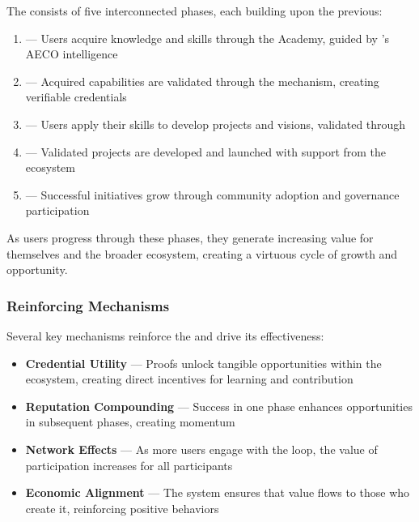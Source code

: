 The  consists of five interconnected phases, each building upon the previous:

\begin{enumerate}
    \item {} — Users acquire knowledge and skills through the Academy, guided by 's AECO intelligence
    
    \item {} — Acquired capabilities are validated through the  mechanism, creating verifiable credentials
    
    \item {} — Users apply their skills to develop projects and visions, validated through 
    
    \item {} — Validated projects are developed and launched with support from the ecosystem
    
    \item {} — Successful initiatives grow through community adoption and governance participation
\end{enumerate}

As users progress through these phases, they generate increasing value for themselves and the broader ecosystem, creating a virtuous cycle of growth and opportunity.

\subsubsection*{Reinforcing Mechanisms}

Several key mechanisms reinforce the  and drive its effectiveness:

\begin{itemize}
    \item \textbf{Credential Utility} — Proofs unlock tangible opportunities within the ecosystem, creating direct incentives for learning and contribution
    
    \item \textbf{Reputation Compounding} — Success in one phase enhances opportunities in subsequent phases, creating momentum
    
    \item \textbf{Network Effects} — As more users engage with the loop, the value of participation increases for all participants
    
    \item \textbf{Economic Alignment} — The  system ensures that value flows to those who create it, reinforcing positive behaviors
\end{itemize}

